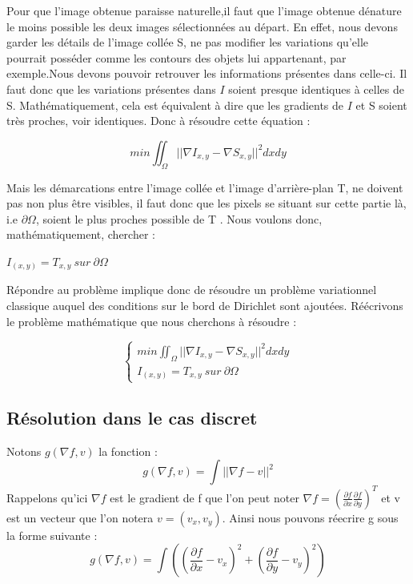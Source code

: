 Pour que l'image obtenue paraisse naturelle,il faut que l'image obtenue dénature le moins possible les deux images sélectionnées au départ. En effet, nous devons garder les détails de l'image collée S, ne pas modifier les variations qu'elle pourrait posséder comme les contours des objets lui appartenant, par exemple.Nous devons pouvoir retrouver les informations présentes dans celle-ci. Il faut donc que les variations présentes dans $I$ soient presque identiques à celles de S. Mathématiquement, cela est équivalent à dire que les gradients de $I$ et S soient très proches, voir identiques. Donc à résoudre cette équation :
\begin{center}
    $$ min \iint_\Omega || \nabla I_{x,y} - \nabla S_{x,y}||^2 dxdy$$
\end{center} 

Mais les démarcations entre l'image collée  et l'image d'arrière-plan T, ne doivent pas non plus être visibles, il faut donc que les pixels se situant sur cette partie là, i.e $\partial \Omega$, soient le plus proches possible de T .  Nous voulons donc, mathématiquement, chercher : 
\begin{center}
    $I_{(x,y)} = T_{x,y} \ sur\ \partial \Omega$
\end{center}

Répondre au problème implique donc de résoudre un problème variationnel classique auquel des conditions sur le bord de Dirichlet sont ajoutées. 
Réécrivons le problème mathématique que nous cherchons à résoudre :  

\begin{center}
\begin{equation*}
\left\{
\begin{aligned}
 min \iint_\Omega || \nabla I_{x,y} - \nabla S_{x,y}||^2 dxdy\\
 I_{(x,y)} = T_{x,y} \ sur\ \partial \Omega
\end{aligned}
\right.
\end{equation*}
\end{center}


\subsection{Résolution dans le cas discret}
Notons $g(\nabla f, v)$ la fonction  : 
$$g(\nabla f, v) =\int ||\nabla f-v ||^2$$ 
\newline
Rappelons qu'ici $\nabla f$ est le gradient de f que l'on peut noter $\nabla f = (\frac{\partial f}{\partial x} \frac{\partial f}{\partial y})^T$ et v est un vecteur que l'on notera $v = (v_x, v_y)$. 
Ainsi nous pouvons réecrire g sous la forme suivante : 
$$g(\nabla f, v) =\int( (\frac{\partial f}{\partial x}-v_x)^2+(\frac{\partial f}{\partial y}-v_y)^2) $$\newline

